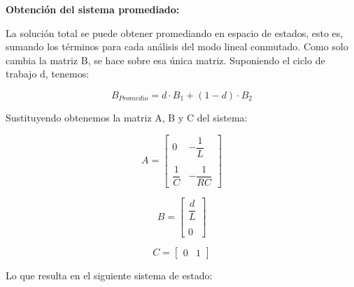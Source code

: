 \textbf{Obtención del sistema promediado:}

La solución total se puede obtener promediando en espacio de estados, esto es, sumando los términos 
para cada análisis del modo lineal conmutado. Como solo cambia la matriz B, se hace sobre esa única matriz.
Suponiendo el ciclo de trabajo d, tenemos:

\vspace{-0.5cm}
\begin{equation}
    B_{Promedio} = d \cdot B_1 + (1 - d) \cdot B_2
\end{equation}

Sustituyendo obtenemos la matriz A, B y C del sistema:

\begin{equation}
    A = \begin{bmatrix}
        0 & -\dfrac{1}{L}\\
        \\
        \dfrac{1}{C} & -\dfrac{1}{RC}
    \end{bmatrix}
\end{equation}

\vspace{-0.5cm}
\begin{equation}
    B = \begin{bmatrix}
        \dfrac{d}{L}\\
        \\
        0
    \end{bmatrix}
\end{equation}

\vspace{-0.5cm}
\begin{equation}
    C = \begin{bmatrix}
        0 & 1
    \end{bmatrix}
\end{equation}

Lo que resulta en el siguiente sistema de estado:

